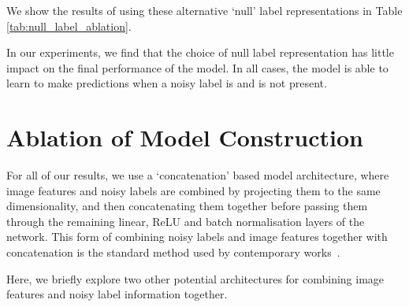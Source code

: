 \documentclass[10pt,twocolumn,letterpaper]{article}
\begin{document}
We show the results of using these alternative `null' label representations in Table \ref{tab:null_label_ablation}.

\begin{table}[ht!]
    \begin{center}
    \end{center}
    \caption{\small Accuracy using different null label methods for Asym. 40\% noise on CIFAR10} 
    \label{tab:null_label_ablation}
\end{table}

In our experiments, we find that the choice of null label representation has little impact on the final performance of the model. In all cases, the model is able to learn to make predictions when a noisy label is and is not present.

\section{Ablation of Model Construction}

For all of our results, we use a `concatenation' based model architecture, where image features and noisy labels are combined by projecting them to the same dimensionality, and then concatenating them together before passing them through the remaining linear, ReLU and batch normalisation layers of the network. This form of combining noisy labels and image features together with concatenation is the standard method used by contemporary works~\cite{gu2021instancedependent,inoue2017multi,veit2017learning}.

Here, we briefly explore two other potential architectures for combining image features and noisy label information together.
\end{document}
